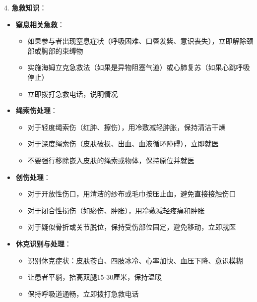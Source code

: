 \documentclass[12pt,UTF8]{ctexbook}
\begin{document}
4. \textbf{急救知识}：
  \begin{itemize}
  \item \textbf{窒息相关急救}：
    \begin{itemize}
    \item 如果参与者出现窒息症状（呼吸困难、口唇发紫、意识丧失），立即解除颈部或胸部的束缚物
    \item 实施海姆立克急救法（如果是异物阻塞气道）或心肺复苏（如果心跳呼吸停止）
    \item 立即拨打急救电话，说明情况
    \end{itemize}
  \item \textbf{绳索伤处理}：
    \begin{itemize}
    \item 对于轻度绳索伤（红肿、擦伤），用冷敷减轻肿胀，保持清洁干燥
    \item 对于深度绳索伤（皮肤破损、出血、血液循环障碍），立即就医
    \item 不要强行移除嵌入皮肤的绳索或物体，保持原位并就医
    \end{itemize}
  \item \textbf{创伤处理}：
    \begin{itemize}
    \item 对于开放性伤口，用清洁的纱布或毛巾按压止血，避免直接接触伤口
    \item 对于闭合性损伤（如瘀伤、肿胀），用冷敷减轻疼痛和肿胀
    \item 对于疑似骨折或关节脱位，保持受伤部位固定，避免移动，立即就医
    \end{itemize}
  \item \textbf{休克识别与处理}：
    \begin{itemize}
    \item 识别休克症状：皮肤苍白、四肢冰冷、心率加快、血压下降、意识模糊
    \item 让患者平躺，抬高双腿15-30厘米，保持温暖
    \item 保持呼吸道通畅，立即拨打急救电话
    \end{itemize}
  \end{itemize}
\end{document}
